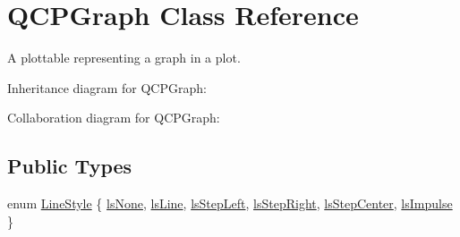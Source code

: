\hypertarget{classQCPGraph}{}\section{Q\+C\+P\+Graph Class Reference}
\label{classQCPGraph}


A plottable representing a graph in a plot.  




Inheritance diagram for Q\+C\+P\+Graph\+:


Collaboration diagram for Q\+C\+P\+Graph\+:
\subsection*{Public Types}
\begin{DoxyCompactItemize}
\item 
enum \hyperlink{classQCPGraph_ad60175cd9b5cac937c5ee685c32c0859}{Line\+Style} \{ \newline
\hyperlink{classQCPGraph_ad60175cd9b5cac937c5ee685c32c0859aea9591b933733cc7b20786b71e60fa04}{ls\+None}, 
\hyperlink{classQCPGraph_ad60175cd9b5cac937c5ee685c32c0859a3c42a27b15aa3c92d399082fad8b7515}{ls\+Line}, 
\hyperlink{classQCPGraph_ad60175cd9b5cac937c5ee685c32c0859ae10568bda57836487d9dec5eba1d6c6e}{ls\+Step\+Left}, 
\hyperlink{classQCPGraph_ad60175cd9b5cac937c5ee685c32c0859a9c37951f7d11aa070100fd16f2935c9e}{ls\+Step\+Right}, 
\newline
\hyperlink{classQCPGraph_ad60175cd9b5cac937c5ee685c32c0859a5adf7b04da215a40a764c21294ea7366}{ls\+Step\+Center}, 
\hyperlink{classQCPGraph_ad60175cd9b5cac937c5ee685c32c0859aa3b358b4ae7cca94aceeb8e529c12ebb}{ls\+Impulse}
 \}
\end{DoxyCompactItemize}
